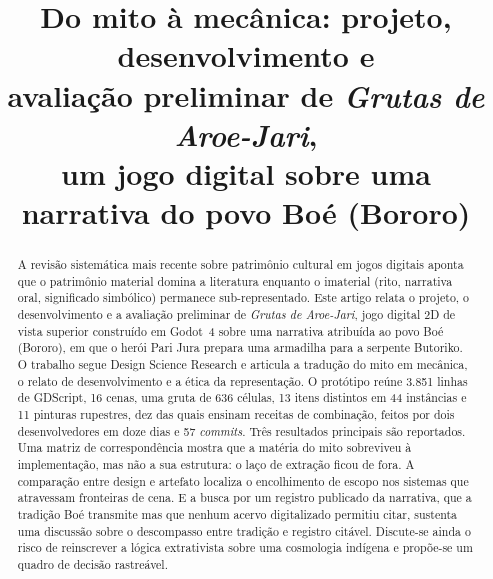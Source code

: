 \documentclass[conference]{IEEEtran}
\begin{document}
\title{Do mito à mecânica: projeto, desenvolvimento e\\
avaliação preliminar de \textit{Grutas de Aroe-Jari},\\
um jogo digital sobre uma narrativa do povo Boé (Bororo)}

\author{%
\and
{}
 }

\maketitle
{}

\begin{abstract}
A revisão sistemática mais recente sobre patrimônio cultural em jogos digitais aponta que
o patrimônio material domina a literatura enquanto o imaterial (rito, narrativa oral, significado simbólico) permanece sub-representado. Este artigo relata o projeto, o
desenvolvimento e a avaliação preliminar de \textit{Grutas de Aroe-Jari}, jogo digital 2D
de vista superior construído em Godot~4 sobre uma narrativa atribuída ao povo Boé
(Bororo), em que o herói Pari Jura prepara uma armadilha para a serpente Butoriko. O
trabalho segue Design Science Research e articula a tradução do mito em mecânica, o relato
de desenvolvimento e a ética da representação. O protótipo reúne 3.851 linhas de
GDScript, 16 cenas, uma gruta de 636 células, 13 itens distintos em 44 instâncias e 11
pinturas rupestres, dez das quais ensinam receitas de combinação, feitos por dois
desenvolvedores em doze dias e 57 \textit{commits}.
Três resultados principais são reportados. Uma matriz de correspondência mostra que a
matéria do mito sobreviveu à implementação, mas não a sua estrutura: o laço de extração
ficou de fora. A comparação entre design e artefato localiza o encolhimento de escopo nos
sistemas que atravessam fronteiras de cena. E a busca por um registro publicado da
narrativa, que a tradição Boé transmite mas que nenhum acervo digitalizado permitiu citar,
sustenta uma discussão sobre o descompasso entre tradição e registro citável. Discute-se ainda o risco de
reinscrever a lógica extrativista sobre uma cosmologia indígena e propõe-se um quadro de
decisão rastreável.
\end{abstract}
\end{document}
